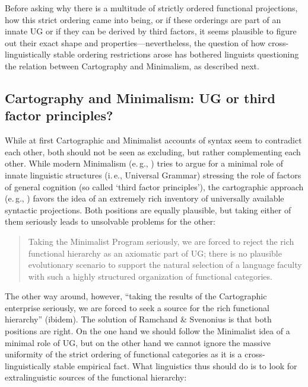 \noindent Before asking why there is a multitude of strictly ordered functional projections, how this strict ordering came into being, or if these orderings are part of an innate UG or if they can be derived by third factors, it seems plausible to figure out their exact shape and properties---nevertheless, the question of how cross-linguistically stable ordering restrictions arose has bothered linguists questioning the relation between Cartography and Minimalism, as described next.

\subsection{Cartography and Minimalism: UG or third factor principles?}
\noindent While at first Cartographic and Minimalist accounts of syntax seem to contradict each other, both should not be seen as excluding, but rather complementing each other. While modern Minimalism (e.\,g., \citealt{chomsky2005three}) tries to argue for a minimal role of innate linguistic structures (i.\,e., Universal Grammar) stressing the role of factors of general cognition (so called `third factor principles'), the cartographic approach (e.\,g., \citealt{cinque1999adverbs}) favors the idea of an extremely rich inventory of universally available syntactic projections. Both positions are equally plausible, but taking either of them seriously leads to unsolvable problems for the other:

\begin{quote}
Taking the Minimalist Program seriously, we are forced to reject the rich functional hierarchy as an axiomatic part of UG; there is no plausible evolutionary scenario to support the natural selection of a language faculty with such a highly structured organization of functional categories. \citep[172]{ramchand2014deriving}
\end{quote}

\noindent The other way around, however, ``taking the results of the Cartographic enterprise seriously, we are forced to seek a source for the rich functional hierarchy'' (ibidem). The solution of Ramchand \& Svenonius is that both positions are right. On the one hand we should follow the Minimalist idea of a minimal role of UG, but on the other hand we cannot ignore the massive uniformity of the strict ordering of functional categories as it is a cross-linguistically stable empirical fact. What linguistics thus should do is to look for extralinguistic sources of the functional hierarchy:

